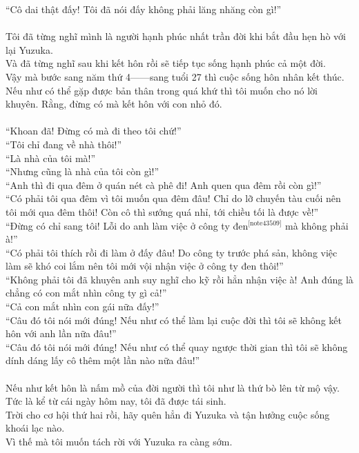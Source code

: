\documentclass[12pt,a4paper, twosides]{book}
\begin{document}
“Cô dai thật đấy! Tôi đã nói đấy không phải lăng nhăng còn gì!”\\
\\
Tôi đã từng nghĩ mình là người hạnh phúc nhất trần đời khi bắt đầu hẹn hò với lại Yuzuka.\\
Và đã từng nghĩ sau khi kết hôn rồi sẽ tiếp tục sống hạnh phúc cả một đời.\\
Vậy mà bước sang năm thứ 4——sang tuổi 27 thì cuộc sống hôn nhân kết thúc.\\
Nếu như có thể gặp được bản thân trong quá khứ thì tôi muốn cho nó lời khuyên. Rằng, đừng có mà kết hôn với con nhỏ đó.\\
\\
“Khoan đã! Đừng có mà đi theo tôi chứ!”\\
“Tôi chỉ đang về nhà thôi!”\\
“Là nhà của tôi mà!”\\
“Nhưng cũng là nhà của tôi còn gì!”\\
“Anh thì đi qua đêm ở quán nét cà phê đi! Anh quen qua đêm rồi còn gì!”\\
“Có phải tôi qua đêm vì tôi muốn qua đêm đâu! Chỉ do lỡ chuyến tàu cuối nên tôi mới qua đêm thôi! Còn cô thì sướng quá nhỉ, tới chiều tối là được về!”\\
“Đừng có chỉ sang tôi! Lỗi do anh làm việc ở công ty đen$^\text{[note43509]}$ mà không phải à!”\\
“Có phải tôi thích rồi đi làm ở đấy đâu! Do công ty trước phá sản, không việc làm sẽ khó coi lắm nên tôi mới vội nhận việc ở công ty đen thôi!”\\
“Không phải tôi đã khuyên anh suy nghĩ cho kỹ rồi hẳn nhận việc à! Anh đúng là chẳng có con mắt nhìn công ty gì cả!”\\
“Cả con mắt nhìn con gái nữa đấy!”\\
“Câu đó tôi nói mới đúng! Nếu như có thể làm lại cuộc đời thì tôi sẽ không kết hôn với anh lần nữa đâu!”\\
“Câu đó tôi nói mới đúng! Nếu như có thể quay ngược thời gian thì tôi sẽ không dính dáng lấy cô thêm một lần nào nữa đâu!”\\
\\
Nếu như kết hôn là nấm mồ của đời người thì tôi như là thứ bò lên từ mộ vậy.\\
Tức là kể từ cái ngày hôm nay, tôi đã được tái sinh.\\
Trời cho cơ hội thứ hai rồi, hãy quên hẳn đi Yuzuka và tận hưởng cuộc sống khoái lạc nào.\\
Vì thế mà tôi muốn tách rời với Yuzuka ra càng sớm.\\
\end{document}
